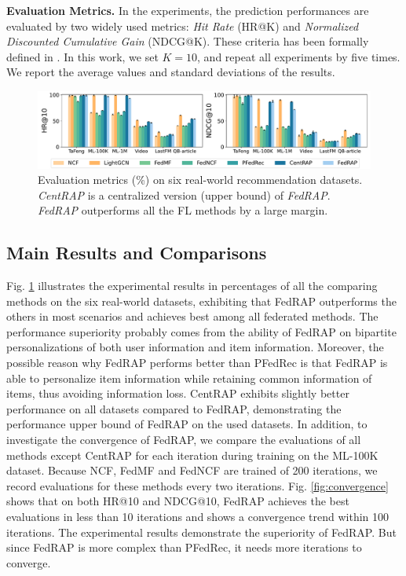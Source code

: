 \documentclass{article} %
\begin{document}
\textbf{Evaluation Metrics.} 
In the experiments, the prediction performances are evaluated by two widely used metrics: \textit{Hit Rate} (HR@K) and \textit{Normalized Discounted Cumulative Gain} (NDCG@K).
These criteria has been formally defined in \citet{he2015trirank}.
In this work, we set $K=10$, and repeat all experiments by five times. 
We report the average values and standard deviations of the results.

\begin{figure}[htbp]
    \begin{center}
        \includegraphics[width = .87\linewidth]{results.pdf}
    \end{center}
    \caption{
        Evaluation metrics (\%) on six real-world recommendation datasets. 
        \textit{CentRAP} is a centralized version (upper bound) of \textit{FedRAP}. \textit{FedRAP} outperforms all the FL methods by a large margin.}
    \label{fig:comparing_methods}
\end{figure}

\subsection{Main Results and Comparisons}

Fig. \ref{fig:comparing_methods} illustrates the experimental results in percentages of all the comparing methods on the six real-world datasets, 
exhibiting that FedRAP outperforms the others in most scenarios and achieves best among all federated methods.
The performance superiority probably comes from the ability of FedRAP on bipartite personalizations of both user information and item information.
Moreover, the possible reason why FedRAP performs better than PFedRec is that FedRAP is able to personalize item information while retaining common information of items, thus avoiding information loss.
CentRAP exhibits slightly better performance on all datasets compared to FedRAP, demonstrating the performance upper bound of FedRAP on the used datasets.
In addition, to investigate the convergence of FedRAP, we compare the evaluations of all methods except CentRAP for each iteration during training on the ML-100K dataset. Because NCF, FedMF and FedNCF are trained of 200 iterations, we record evaluations for these methods every two iterations.
Fig. \ref{fig:convergence} shows that on both HR@10 and NDCG@10, FedRAP achieves the best evaluations in less than 10 iterations and shows a convergence trend within 100 iterations.
The experimental results demonstrate the superiority of FedRAP.
But since FedRAP is more complex than PFedRec, it needs more iterations to converge.
\end{document}

